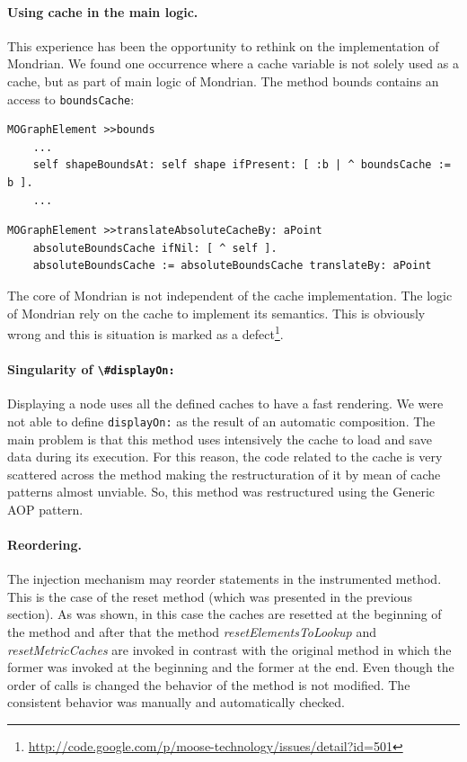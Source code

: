 \documentclass[preprint,10pt]{sigplanconf}
\newcommand{\ct}{\lstinline[backgroundcolor=\color{white},basicstyle=\footnotesize\ttfamily]}
\begin{document}
\paragraph{Using cache in the main logic.}
This experience has been the opportunity to rethink on the implementation of Mondrian. We found one occurrence where a cache variable is not solely used as a cache, but as part of main logic of Mondrian. The method bounds contains an access to \ct{boundsCache}: 

\begin{lstlisting} 
MOGraphElement >>bounds
	...
	self shapeBoundsAt: self shape ifPresent: [ :b | ^ boundsCache := b ].
	...
\end{lstlisting}

\begin{lstlisting} 
MOGraphElement >>translateAbsoluteCacheBy: aPoint
	absoluteBoundsCache ifNil: [ ^ self ].
	absoluteBoundsCache := absoluteBoundsCache translateBy: aPoint
\end{lstlisting}

The core of Mondrian is not independent of the cache implementation. The logic of Mondrian rely on the cache to implement its semantics. This is obviously wrong and this is situation is marked as a defect\footnote{\url{http://code.google.com/p/moose-technology/issues/detail?id=501}}.

\paragraph{Singularity of \ct{\#displayOn:}} Displaying a node uses all the defined caches to have a fast rendering. We were not able to define \ct{displayOn:} as the result of an automatic composition. The main problem is that this method uses intensively the cache to load and save data during its execution. For this reason, the code related to the cache is very scattered across the method  making the restructuration of it by mean of cache patterns almost unviable. So, this method was restructured using the Generic AOP pattern. 


\paragraph{Reordering.} The injection mechanism may reorder statements in the instrumented method. This is the case of the reset method (which was presented in the previous section). As was shown, in this case the caches are resetted at the beginning of the method and after that the method \emph{resetElementsToLookup} and \emph{resetMetricCaches} are invoked in contrast with the original method in which the former was invoked at the beginning and the former at the end. Even though the order of calls is changed the behavior of the method is not modified. The consistent behavior was manually and automatically checked.
\end{document}
